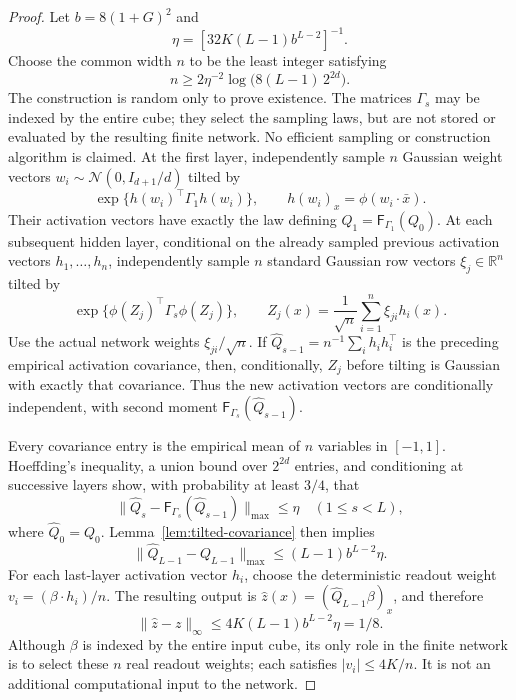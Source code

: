 \begin{proof}
Let $b=8(1+G)^2$ and
\[
 \eta=[32K(L-1)b^{L-2}]^{-1}.
\]
Choose the common width $n$ to be the least integer satisfying
\[
 n\geq2\eta^{-2}\log\bigl(8(L-1)\,2^{2d}\bigr).
\]
The construction is random only to prove existence.
The matrices $\Gamma_s$ may be indexed by the entire cube; they select the
sampling laws, but are not stored or evaluated by the resulting finite
network. No efficient sampling or construction algorithm is claimed.
At the first layer, independently sample $n$ Gaussian weight vectors
$w_i\sim\mathcal N(0,I_{d+1}/d)$ tilted by
\[
 \exp\{h(w_i)^\top\Gamma_1h(w_i)\},\qquad
 h(w_i)_x=\phi(w_i\cdot\bar x).
\]
Their activation vectors have exactly the law defining
$Q_1=\mathsf F_{\Gamma_1}(Q_0)$.
At each subsequent hidden layer, conditional on the already sampled previous
activation vectors $h_1,\ldots,h_n$, independently sample $n$ standard
Gaussian row vectors $\xi_j\in\mathbb R^n$ tilted by
\[
 \exp\{\phi(Z_j)^\top\Gamma_s\phi(Z_j)\},
 \qquad Z_j(x)=\frac1{\sqrt n}\sum_{i=1}^n\xi_{ji}h_i(x).
\]
Use the actual network weights $\xi_{ji}/\sqrt n$.
If $\widehat Q_{s-1}=n^{-1}\sum_i h_ih_i^\top$ is the preceding empirical
activation covariance, then, conditionally, $Z_j$ before tilting is Gaussian
with exactly that covariance. Thus the new activation vectors are
conditionally independent, with second moment
$\mathsf F_{\Gamma_s}(\widehat Q_{s-1})$.

Every covariance entry is the empirical mean of $n$ variables in $[-1,1]$.
Hoeffding's inequality, a union bound over $2^{2d}$ entries, and conditioning
at successive layers show, with probability at least $3/4$, that
\[
 \|\widehat Q_s-
          \mathsf F_{\Gamma_s}(\widehat Q_{s-1})\|_{\max}\leq\eta
 \quad(1\leq s<L),
\]
where $\widehat Q_0=Q_0$.
Lemma~\ref{lem:tilted-covariance} then implies
\[
 \|\widehat Q_{L-1}-Q_{L-1}\|_{\max}
 \leq (L-1)b^{L-2}\eta.
\]
For each last-layer activation vector $h_i$, choose the deterministic
readout weight $v_i=(\beta\cdot h_i)/n$. The resulting output is
$\widehat z(x)=(\widehat Q_{L-1}\beta)_x$, and therefore
\[
 \|\widehat z-z\|_\infty
 \leq4K(L-1)b^{L-2}\eta=1/8.
\]
Although $\beta$ is indexed by the entire input cube, its only role in the
finite network is to select these $n$ real readout weights; each satisfies
$|v_i|\leq4K/n$. It is not an additional computational input to the network.


\end{proof}
